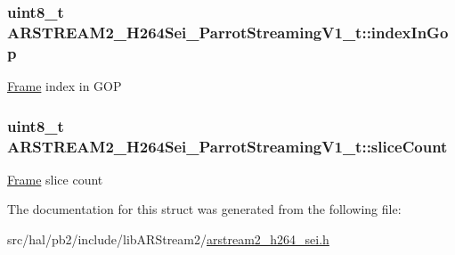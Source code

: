\subsubsection[{\texorpdfstring{index\+In\+Gop}{indexInGop}}]{\setlength{\rightskip}{0pt plus 5cm}uint8\+\_\+t A\+R\+S\+T\+R\+E\+A\+M2\+\_\+\+H264\+Sei\+\_\+\+Parrot\+Streaming\+V1\+\_\+t\+::index\+In\+Gop}\hypertarget{struct_a_r_s_t_r_e_a_m2___h264_sei___parrot_streaming_v1__t_abf3f238cf25c5696a3b7f742fdf41624}{}\label{struct_a_r_s_t_r_e_a_m2___h264_sei___parrot_streaming_v1__t_abf3f238cf25c5696a3b7f742fdf41624}
\hyperlink{struct_frame}{Frame} index in G\+OP 
\subsubsection[{\texorpdfstring{slice\+Count}{sliceCount}}]{\setlength{\rightskip}{0pt plus 5cm}uint8\+\_\+t A\+R\+S\+T\+R\+E\+A\+M2\+\_\+\+H264\+Sei\+\_\+\+Parrot\+Streaming\+V1\+\_\+t\+::slice\+Count}\hypertarget{struct_a_r_s_t_r_e_a_m2___h264_sei___parrot_streaming_v1__t_ab1000596ae4aed4d2dd5763fff495620}{}\label{struct_a_r_s_t_r_e_a_m2___h264_sei___parrot_streaming_v1__t_ab1000596ae4aed4d2dd5763fff495620}
\hyperlink{struct_frame}{Frame} slice count 

The documentation for this struct was generated from the following file\+:\begin{DoxyCompactItemize}
\item 
src/hal/pb2/include/lib\+A\+R\+Stream2/\hyperlink{arstream2__h264__sei_8h}{arstream2\+\_\+h264\+\_\+sei.\+h}\end{DoxyCompactItemize}
